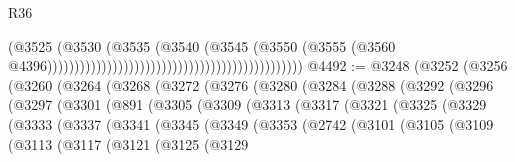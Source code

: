\begin{lexlean}{R36}
\begin{coremodule}
                                                                                  (@3525
                                                                                    (@3530
                                                                                      (@3535
                                                                                        (@3540
                                                                                          (@3545
                                                                                            (@3550
                                                                                              (@3555
                                                                                                (@3560
                                                                                                  @4396)))))))))))))))))))))))))))))))))))))))))))))))
@4492 := @3248
    (@3252
      (@3256
        (@3260
          (@3264
            (@3268
              (@3272
                (@3276
                  (@3280
                    (@3284
                      (@3288
                        (@3292
                          (@3296
                            (@3297
                              (@3301
                                (@891
                                  (@3305
                                    (@3309
                                      (@3313
                                        (@3317
                                          (@3321
                                            (@3325
                                              (@3329
                                                (@3333
                                                  (@3337
                                                    (@3341
                                                      (@3345
                                                        (@3349
                                                          (@3353
                                                            (@2742
                                                              (@3101
                                                                (@3105
                                                                  (@3109
                                                                    (@3113
                                                                      (@3117
                                                                        (@3121
                                                                          (@3125
                                                                            (@3129

\end{coremodule}
\end{lexlean}

